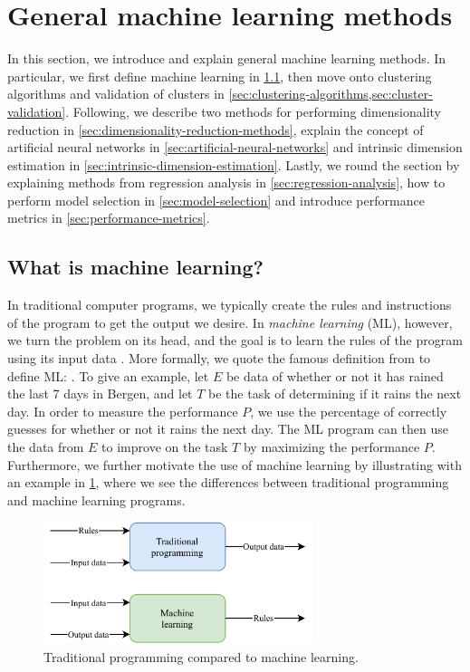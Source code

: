 \section{General machine learning methods}
In this section, we introduce and explain general machine learning methods. In particular, we first define machine learning in \cref{sec:what-is-machine-learning}, then move onto clustering algorithms and validation of clusters in \cref{sec:clustering-algorithms,sec:cluster-validation}. Following, we describe two methods for performing dimensionality reduction in \cref{sec:dimensionality-reduction-methods}, explain the concept of artificial neural networks in \cref{sec:artificial-neural-networks} and intrinsic dimension estimation in \cref{sec:intrinsic-dimension-estimation}. Lastly, we round the section by explaining methods from regression analysis in \cref{sec:regression-analysis}, how to perform model selection in \cref{sec:model-selection} and introduce performance metrics in \cref{sec:performance-metrics}.

\subsection{What is machine learning?}
\label{sec:what-is-machine-learning}
In traditional computer programs, we typically create the rules and instructions of the program to get the output we desire. In \textit{machine learning} (ML), however, we turn the problem on its head, and the goal is to learn the rules of the program using its input data \cite{Mitchell1997}. More formally, we quote the famous definition from \cite[p. 2]{Mitchell1997} to define ML: . To give an example, let $E$ be data of whether or not it has rained the last 7 days in Bergen, and let $T$ be the task of determining if it rains the next day. In order to measure the performance $P$, we use the percentage of correctly guesses for whether or not it rains the next day. The ML program can then use the data from $E$ to improve on the task $T$ by maximizing the performance $P$. Furthermore, we further motivate the use of machine learning by illustrating with an example in \cref{fig:ml-versus-tradional-programming}, where we see the differences between traditional programming and machine learning programs.
\begin{figure}[H]
    \centering
    \includegraphics[width=0.7\textwidth]{thesis/figures/ml-versus-tradional-programming_cropped.pdf}
    \caption{Traditional programming compared to machine learning.}
    \label{fig:ml-versus-tradional-programming}
\end{figure}

